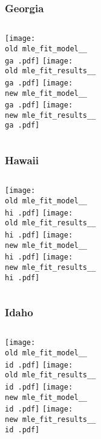 \documentclass{beamer}
\newcommand{\old}{api-370-prod/pyseir/state_summaries/reports/}
\newcommand{\new}{new/pyseir/state_summaries/reports/}
\newcommand{\ga}{Georgia__13}
\newcommand{\hi}{Hawaii__15}
\newcommand{\id}{Idaho__16}
\begin{document}
\begin{frame}
\frametitle{Georgia}
    \begin{columns}[t]

       \texttt{[image: \\old mle\_fit\_model\_\_\\ga .pdf]}
       \texttt{[image: \\old mle\_fit\_results\_\_\\ga .pdf]}   
       \texttt{[image: \\new mle\_fit\_model\_\_\\ga .pdf]}
       \texttt{[image: \\new mle\_fit\_results\_\_\\ga .pdf]}   
       
\end{columns}
\end{frame}

\begin{frame}
\frametitle{Hawaii}
    \begin{columns}[t]

       \texttt{[image: \\old mle\_fit\_model\_\_\\hi .pdf]}
       \texttt{[image: \\old mle\_fit\_results\_\_\\hi .pdf]}   
       \texttt{[image: \\new mle\_fit\_model\_\_\\hi .pdf]}
       \texttt{[image: \\new mle\_fit\_results\_\_\\hi .pdf]}   
       
\end{columns}
\end{frame}

\begin{frame}
\frametitle{Idaho}
    \begin{columns}[t]

       \texttt{[image: \\old mle\_fit\_model\_\_\\id .pdf]}
       \texttt{[image: \\old mle\_fit\_results\_\_\\id .pdf]}   
       \texttt{[image: \\new mle\_fit\_model\_\_\\id .pdf]}
       \texttt{[image: \\new mle\_fit\_results\_\_\\id .pdf]}   
       
\end{columns}
\end{frame}
\end{document}
